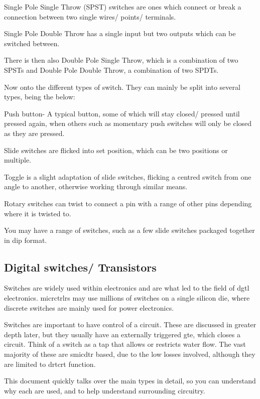 \documentclass[a4paper,11pt]{report}
\begin{document}
Single Pole Single Throw (SPST) switches are ones which connect or break a connection between two single wires/ points/ terminals.

Single Pole Double Throw has a single input but two outputs which can be switched between.

There is then also Double Pole Single Throw, which is a combination of two SPSTs and Double Pole Double Throw, a combination of two SPDTs.

Now onto the different types of switch. They can mainly be split into several types, being the below:

Push button- A typical button, some of which will stay closed/ pressed until pressed again, when others such as momentary push switches will only be closed as they are pressed.

Slide switches are flicked into set position, which can be two positions or multiple.

Toggle is a slight adaptation of slide switches, flicking a centred switch from one angle to another, otherwise working through similar means.

Rotary switches can twist to connect a pin with a range of other pins depending where it is twisted to.

You may have a range of switches, such as a few slide switches packaged together in \gls{dip} format.

\vspace*{1\baselineskip}

\subsection{Digital switches/ Transistors}

Switches are widely used within electronics and are what led to the field of \gls{dgtl} electronics. \gls{micrctrlr}s may use millions of switches on a single silicon \gls{die}, where discrete switches are mainly used for power electronics.

Switches are important to have control of a circuit. These are discussed in greater depth later, but they usually have an externally triggered \gls{gte}, which closes a circuit. Think of a switch as a tap that allows or restricts water flow. The vast majority of these are \gls{smicdtr} based, due to the low losses involved, although they are limited to \gls{drtcrt} function.

This document quickly talks over the main types in detail, so you can understand why each are used, and to help understand surrounding circuitry.
\end{document}
